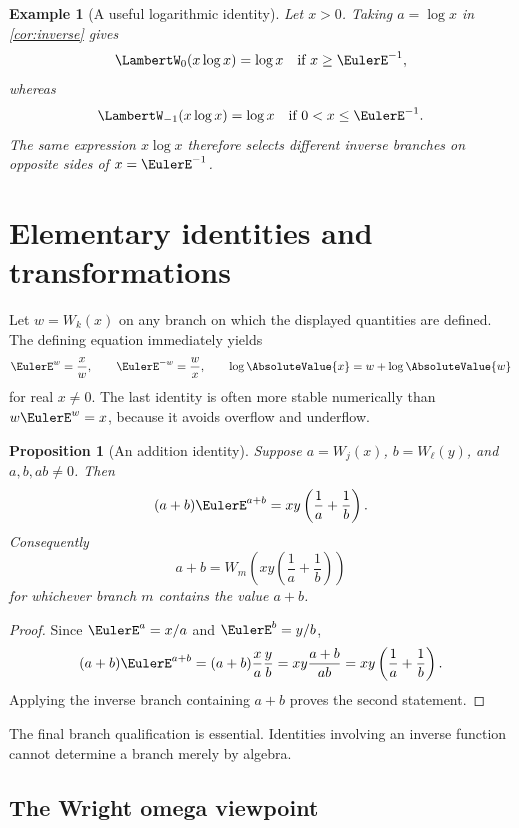 \documentclass[11pt]{article}
\newtheorem{proposition}[proposition]{Proposition}
\newtheorem{example}[example]{Example}
\theoremstyle{remark}
\newcommand{\Wz}{\LambertW_{0}}
\newcommand{\Wm}{\LambertW_{-1}}
\begin{document}
\begin{example}[A useful logarithmic identity]\label{ex:xlogx}
Let \(x>0\).  Taking \(a=\log x\) in \cref{cor:inverse} gives
\[
 \Wz(x\log x)=\log x\quad\text{if }x\geq\EulerE^{-1},
\]
whereas
\[
 \Wm(x\log x)=\log x\quad\text{if }0<x\leq\EulerE^{-1}.
\]
The same expression \(x\log x\) therefore selects different inverse branches
on opposite sides of \(x=\EulerE^{-1}\).
\end{example}

\section{Elementary identities and transformations}\label{sec:identities}

Let \(w=W_k(x)\) on any branch on which the displayed quantities are defined.
The defining equation immediately yields
\begin{equation}\label{eq:basicidentities}
 \EulerE^w=\frac{x}{w},\qquad
 \EulerE^{-w}=\frac{w}{x},\qquad
 \log\AbsoluteValue{x}=w+\log\AbsoluteValue{w}
\end{equation}
for real \(x\neq0\).  The last identity is often more stable numerically than
\(w\EulerE^w=x\), because it avoids overflow and underflow.

\begin{proposition}[An addition identity]\label{prop:addition}
Suppose \(a=W_j(x)\), \(b=W_\ell(y)\), and \(a,b,ab\neq0\).  Then
\begin{equation}\label{eq:addition}
 (a+b)\EulerE^{a+b}
   =xy\left(\frac1a+\frac1b\right).
\end{equation}
Consequently
\[
 a+b=W_m\left(xy\left(\frac1a+\frac1b\right)\right)
\]
for whichever branch \(m\) contains the value \(a+b\).
\end{proposition}

\begin{proof}
Since \(\EulerE^a=x/a\) and \(\EulerE^b=y/b\),
\[
 (a+b)\EulerE^{a+b}
 =(a+b)\frac{x}{a}\frac{y}{b}
 =xy\frac{a+b}{ab}
 =xy\left(\frac1a+\frac1b\right).
\]
Applying the inverse branch containing \(a+b\) proves the second statement.
\end{proof}

The final branch qualification is essential.  Identities involving an
inverse function cannot determine a branch merely by algebra.

\subsection{The Wright omega viewpoint}
\end{document}
